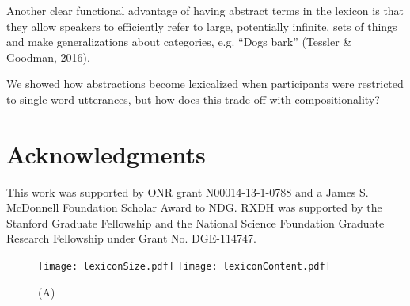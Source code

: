 \documentclass[10pt,letterpaper]{article}
\begin{document}
Another clear functional advantage of having abstract terms in the lexicon is that they allow speakers to efficiently refer to large, potentially infinite, sets of things and make generalizations about categories, e.g. ``Dogs bark'' (Tessler \& Goodman, 2016). 

We showed how abstractions become lexicalized when participants were restricted to single-word utterances, but how does this trade off with compositionality?



\section{\bf Acknowledgments}
\small
This work was supported by ONR grant N00014-13-1-0788 and a James S. McDonnell Foundation Scholar Award to NDG. RXDH was supported by the Stanford Graduate Fellowship and the National Science Foundation Graduate Research Fellowship under Grant No. DGE-114747.

\begin{figure*}[t]
\begin{center}
{\texttt{[image: lexiconSize.pdf]}}
{\texttt{[image: lexiconContent.pdf]}}
{\caption{{\footnotesize (A)   \label{exp}}}}
\end{center}
\end{figure*}



\setlength{\bibleftmargin}{.125in}
\setlength{\bibindent}{-\bibleftmargin}


\end{document}
